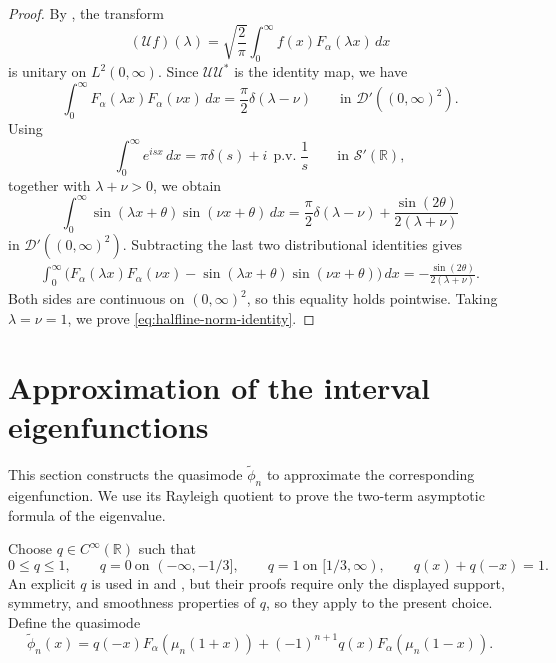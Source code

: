 \documentclass[11pt]{amsart}
\numberwithin{equation}{section}
\theoremstyle{remark}
\newcommand{\R}{\mathbb R}
\newcommand{\wt}{\widetilde}
\newcommand{\pv}{\operatorname{p.v.}}
\begin{document}
\begin{proof}
By \cite[Theorem~1.3]{KwasnickiHalfLine}, the transform
\[
(\mathcal{U}f)(\lambda)=
\sqrt{\frac2\pi}
\int_0^\infty f(x)F_\alpha(\lambda x)\,dx
\]
is unitary on \(L^2(0,\infty)\).  Since $\mathcal{U}\mathcal{U}^*$ is the identity map, we have
\[
\int_0^\infty
F_\alpha(\lambda x)F_\alpha(\nu x)\,dx
=
\frac{\pi}{2}\delta(\lambda-\nu)
\qquad\text{in }\mathcal D'((0,\infty)^2).
\]
Using
\[
\int_0^\infty e^{isx}\,dx
=
\pi\delta(s)+i\,\pv\frac1s
\qquad\text{in }\mathcal S'(\mathbb R),
\]
together with \(\lambda+\nu>0\), we obtain
\[
\int_0^\infty
\sin(\lambda x+\theta)\sin(\nu x+\theta)\,dx
=
\frac{\pi}{2}\delta(\lambda-\nu)
+
\frac{\sin(2\theta)}{2(\lambda+\nu)}
\]
in \(\mathcal D'((0,\infty)^2)\).  Subtracting the last two
distributional identities gives
\[
\begin{aligned}
	\int_0^\infty
	\bigl(
	F_\alpha(\lambda x)F_\alpha(\nu x)
	-
	\sin(\lambda x+\theta)\sin(\nu x+\theta)
	\bigr)\,dx=
	-\frac{\sin(2\theta)}{2(\lambda+\nu)}.
\end{aligned}
\]
Both sides are continuous on \((0,\infty)^2\), so this equality holds
pointwise.  Taking \(\lambda=\nu=1\), we prove \eqref{eq:halfline-norm-identity}.


\end{proof}


\section{Approximation of the interval eigenfunctions}
\label{sec:glued}

This section constructs the quasimode $\wt\phi_n$ to approximate the corresponding eigenfunction.  We use its Rayleigh quotient to prove
the two-term asymptotic formula of the eigenvalue.

Choose $q\in C^\infty(\R)$ such that
\[
 0\le q\le1,\qquad q=0\ \text{on }(-\infty,-1/3],\qquad
 q=1\ \text{on }[1/3,\infty),\qquad q(x)+q(-x)=1.
\]
An explicit $q$ is used in \cite{KwasnickiInterval} and \cite{KaletaKwasnickiMalecki}, but their proofs
 require only the displayed
support, symmetry, and smoothness properties of $q$, so they apply to the
present choice.  Define the quasimode
\begin{equation}\label{eq:qmode}
 \wt\phi_n(x)=q(-x)F_\alpha(\mu_n(1+x))
 +(-1)^{n+1}q(x)F_\alpha(\mu_n(1-x)).
\end{equation}
\end{document}
